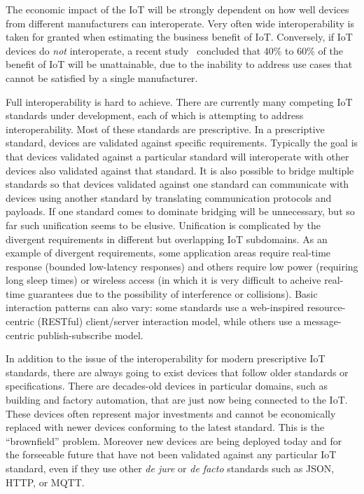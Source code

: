 The economic impact of the IoT will be strongly dependent on how well devices from 
different manufacturers can interoperate.
Very often wide interoperability is taken for granted when estimating the business
benefit of IoT. 
Conversely, if IoT devices do \emph{not} interoperate,
a recent study~\cite{McK2015a} concluded that 40\% to 60\% of the 
benefit of IoT will be unattainable,
due to the inability to address use cases that cannot be satisfied by a single manufacturer.

Full interoperability is hard to achieve.
There are currently many competing IoT standards under development,
each of which is attempting to address interoperability.
Most of these standards are prescriptive.
In a prescriptive standard,
devices are validated against specific requirements.
Typically the goal is that devices validated against 
a particular standard will interoperate with
other devices also validated against that standard.
It is also possible to bridge multiple standards so that
devices validated against one standard can communicate with
devices using another standard by translating communication protocols and payloads.
If one standard comes to dominate bridging will be unnecessary,
but so far such unification seems to be elusive. 
Unification is complicated by the
divergent requirements in different but overlapping IoT subdomains.
As an example of divergent requirements,
some application areas require real-time response (bounded low-latency responses)
and others require low power (requiring long sleep times) or wireless access
(in which it is very difficult to acheive real-time guarantees due to the
possibility of interference or collisions).
Basic interaction patterns can also vary: some standards use
a web-inspired resource-centric (RESTful) client/server interaction model,
while others use a message-centric publish-subscribe model.

In addition to the issue of the interoperability for modern prescriptive IoT standards,
there are always going to exist devices that follow older standards or specifications.
There are decades-old devices in particular domains, such as building and factory
automation, that are just now being connected to the IoT.
These devices often represent major investments and cannot be economically replaced with newer
devices conforming to the latest standard.
This is the ``brownfield'' problem.
Moreover new devices are being deployed today and for the forseeable future 
that have not been validated
against any particular IoT standard,
even if they use other \textit{de jure} or \textit{de facto} standards such as JSON, HTTP, or MQTT.

